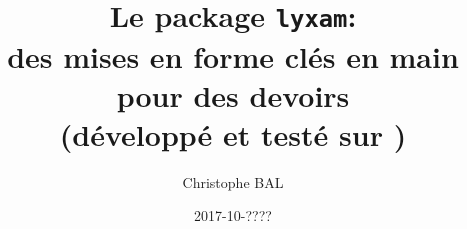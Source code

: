 \documentclass[12pt,a4paper]{article}
\begin{document}
\title{Le package \texttt{lyxam}:\\des mises en forme clés en main\\pour des devoirs\\{\footnotesize (développé et testé sur \macosxname{})}}
\author{Christophe BAL}
\date{2017-10-????}

\maketitle


\end{document}
